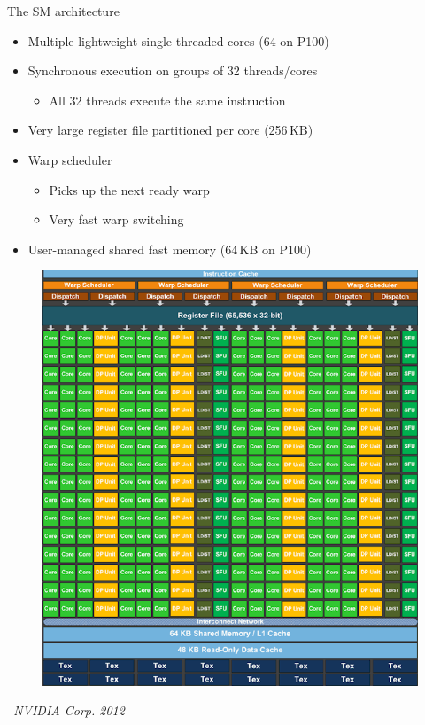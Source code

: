 \documentclass[aspectratio=169,12pt]{beamer}
\begin{document}
\begin{frame}{The SM architecture}
  \begin{minipage}{.74\textwidth}
    \small
    \begin{itemize}
    \item Multiple lightweight single-threaded cores (64 on P100)
    \item Synchronous execution on groups of 32 threads/cores
      \begin{itemize}
      \item All 32 threads execute the same instruction
      \end{itemize}
    \item Very large register file partitioned per core (256\,KB)
    \item Warp scheduler
      \begin{itemize}
      \item Picks up the next ready warp
      \item Very fast warp switching
      \end{itemize}
    \item User-managed shared fast memory (64\,KB on P100)
    \end{itemize}
  \end{minipage}
  \begin{minipage}{.25\textwidth}
    \begin{figure}
      \centering
      \includegraphics[width=\textwidth,height=.7\textheight]{smx_arch.png}
    \end{figure}
    \begin{center}
      \vspace{-\baselineskip}
      \emph{\scriptsize\textcopyright\ NVIDIA Corp. 2012}
    \end{center}
  \end{minipage}
\end{frame}
\end{document}
